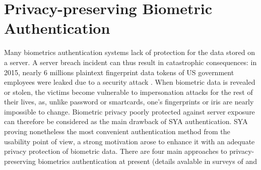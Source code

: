 \section{Privacy-preserving Biometric Authentication}
\label{sec:privacyLiteratures}
Many biometrics authentication systems lack of protection for the data
stored on a server. A server breach incident can thus result in catastrophic
consequences: in 2015, nearly 6 millions plaintext fingerprint data tokens of US
government employees were leaked due to a security attack
\cite{OPMsays563:online}. When biometric data is revealed or stolen, the victims become vulnerable to impersonation attacks for the rest of their lives, as, unlike password or smartcards, one’s fingerprints or iris are nearly impossible to change. Biometric privacy poorly protected against server exposure can therefore be considered as the main drawback of SYA authentication. SYA proving nonetheless the most convenient authentication method from the usability point of view, a strong
motivation arose to enhance it with an adequate privacy protection of
biometric data. There are four main approaches to privacy-preserving biometrics
authentication at present (details avalable in surveys of \cite{jain201650} and
